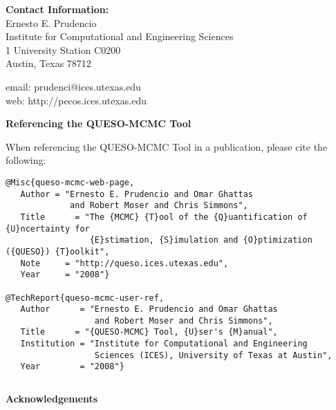 {\bf Contact Information:}\\
Ernesto E. Prudencio\\
Institute for Computational and Engineering Sciences\\
1 University Station C0200\\
Austin, Texas 78712

email: prudenci@ices.utexas.edu\\
web: http://pecos.ices.utexas.edu\\
$~$\\

\centerline{\bf Referencing the QUESO-MCMC Tool}

When referencing the QUESO-MCMC Tool in a publication, please cite the following:
\begin{verbatim}
@Misc{queso-mcmc-web-page,
   Author = "Ernesto E. Prudencio and Omar Ghattas
             and Robert Moser and Chris Simmons",
   Title      = "The {MCMC} {T}ool of the {Q}uantification of {U}ncertainty for
                 {E}stimation, {S}imulation and {O}ptimization ({QUESO}) {T}oolkit",
   Note     = "http://queso.ices.utexas.edu",
   Year     = "2008"}

@TechReport{queso-mcmc-user-ref,
   Author      = "Ernesto E. Prudencio and Omar Ghattas
                  and Robert Moser and Chris Simmons",
   Title      = "{QUESO-MCMC} Tool, {U}ser's {M}anual",
   Institution = "Institute for Computational and Engineering
                  Sciences (ICES), University of Texas at Austin",
   Year        = "2008"}
\end{verbatim}
$~$\\
$~$\\

\centerline{\bf Acknowledgements}

